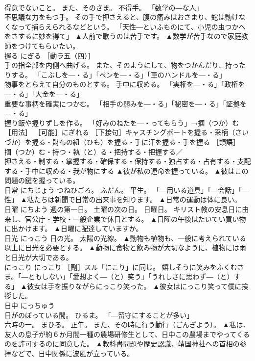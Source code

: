 \documentclass[8pt]{extreport}
\begin{document}
\begin{CJK}{UTF8}{min}
\\	得意でないこと。 また、そのさま。 不得手。 「数学の―な人」 
\\	不思議な力をもつ手。 その手で押さえると、腹の痛みはおさまり、蛇は動けなくなって捕らえられるなどという。 「天性―といふものにて、小児の虫つかへをさするに妙を得て」	▲人前で歌うのは苦手です。 ▲数学が苦手なので家庭教師をつけてもらいたい。
\\	握る	にぎる	［動ラ五（四）］ 
\\	手の指全部を内側へ曲げる。 また、そのようにして、物をつかんだり、持ったりする。 「こぶしを―・る」「ペンを―・る」「車のハンドルを―・る」 
\\	物事をとらえて自分のものとする。 手中に収める。 「実権を―・る」「政権を―・る」「大金を―・る」 
\\	重要な事柄を確実につかむ。 「相手の弱みを―・る」「秘密を―・る」「証拠を―・る」 
\\	握り飯や握りずしを作る。 「好みのねたを―・ってもらう」→掴（つか）む［用法］ ［可能］にぎれる ［下接句］キャスチングボートを握る・采柄（さいづか）を握る・財布の紐（ひも）を握る・手に汗を握る・手を握る ［類語］
\\	掴（つか）む・持つ・執（と）る・把持する・把握する／
\\	押さえる・制する・掌握する・確保する・保持する・独占する・占有する・支配する・手中に収める・我が物にする	▲彼が私の運命を握っている。 ▲彼はこの問題の鍵を握っている。
\\	日常	にちじょう	つねひごろ。 ふだん。 平生。 「―用いる道具」「―会話」「―性」	▲私たちは新聞で日常の出来事を知ります。 ▲日常の運動は体に良い。
\\	日曜	にちよう	週の第一日。 土曜の次の日。 日曜日。 キリスト教の安息日に由来し、官公庁・学校・一般企業で休日とする。	▲日曜の午後はたいてい買い物に出かけます。 ▲日曜に配達していますか。
\\	日光	にっこう	日の光。 太陽の光線。	▲動物も植物も、一般に考えられている以上に日光を必要とする。 ▲動物に食物と飲み物が大切なように、植物には雨と日光が大切である。
\\	にっこり	にっこり	［副］スル「にこり」に同じ。 嬉しそうに笑みをふくむさま。「―ともしない」「愛想よく―（と）笑う」「うれしさに思わず―（と）する」	▲彼女は手を振りながらにっこり笑った。 ▲彼女はにっこり笑って僕に挨拶した。
\\	日中	にっちゅう	
\\	日がのぼっている間。 ひるま。 「―留守にすることが多い」 
\\	六時の一。 まひる。 正午。 また、その時に行う勤行（ごんぎよう）。	▲私は、友人の息子が約６か月間一種の農場研修生として、日中この農場までやってくるのを許可するのに同意した。 ▲教科書問題や歴史認識、靖国神社への首相の参拝などで、日中関係に波風が立っている。

\end{CJK}
\end{document}
